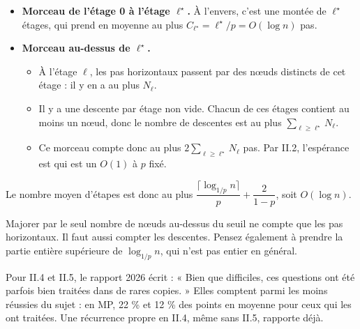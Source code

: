 \documentclass[11pt,a4paper]{article}
\providecommand{\tightlist}{\setlength{\itemsep}{0pt}\setlength{\parskip}{0pt}}
\renewcommand{\geq}{\geqslant}
\newcommand{\equationajustee}[1]{%
  \sbox{\boiteequation}{$\displaystyle #1$}%
  \ifdim\wd\boiteequation>\linewidth
    \[\resizebox{\linewidth}{!}{\usebox{\boiteequation}}\]%
  \else
    \[#1\]%
  \fi}
\begin{document}
\begin{itemize}
\tightlist
\item
  \textbf{Morceau de l'étage 0 à l'étage \(\ell^\star\).} À l'envers, c'est une montée de \(\ell^\star\) étages, qui prend en moyenne au plus \(C_{\ell^\star}=\ell^\star/p=O(\log n)\) pas.
\item
  \textbf{Morceau au-dessus de \(\ell^\star\).}

  \begin{itemize}
  \tightlist
  \item
    À l'étage \(\ell\), les pas horizontaux passent par des nœuds distincts de cet étage : il y en a au plus \(N_\ell\).
  \item
    Il y a une descente par étage non vide. Chacun de ces étages contient au moins un nœud, donc le nombre de descentes est au plus \(\sum_{\ell\geq\ell^\star}N_\ell\).
  \item
    Ce morceau compte donc au plus \(2\sum_{\ell\geq\ell^\star}N_\ell\) pas. Par II.2, l'espérance est
    \equationajustee{\begin{aligned}
    2\sum_{\ell\geq\ell^\star}n\,p^\ell&=\frac{2\,n\,p^{\ell^\star}}{1-p}\\
    &\le\frac2{1-p},
    \end{aligned}}
    qui est un \(O(1)\) à \(p\) fixé.
  \end{itemize}
\end{itemize}

Le nombre moyen d'étapes est donc au plus \(\dfrac{\lceil\log_{1/p}n\rceil}{p}+\dfrac{2}{1-p}\), soit \(\boxed{O(\log n)}\).

\begin{piege}

Majorer par le seul nombre de nœuds au-dessus du seuil ne compte que les pas horizontaux. Il faut aussi compter les descentes. Pensez également à prendre la partie entière supérieure de \(\log_{1/p}n\), qui n'est pas entier en général.

\end{piege}

\begin{jury}

Pour II.4 et II.5, le rapport 2026 écrit : « Bien que difficiles, ces questions ont été parfois bien traitées dans de rares copies. » Elles comptent parmi les moins réussies du sujet : en MP, 22 \% et 12 \% des points en moyenne pour ceux qui les ont traitées. Une récurrence propre en II.4, même sans II.5, rapporte déjà.

\end{jury}
\end{document}
